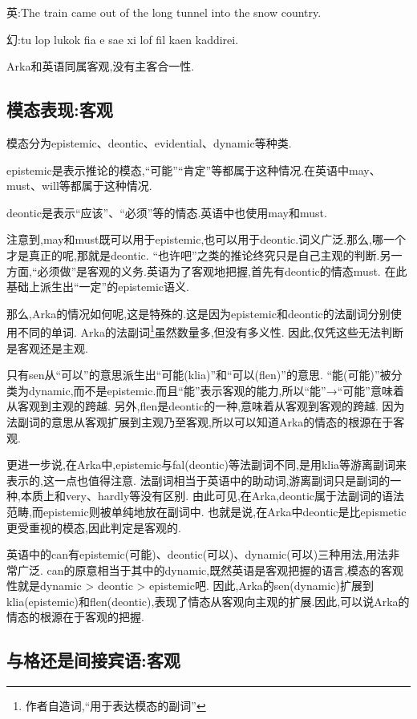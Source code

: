 {\kaishu

英:The train came out of the long tunnel into the snow country.

幻:tu lop lukok fia e sae xi lof fil kaen kaddirei.
}

Arka和英语同属客观,没有主客合一性.

\subsection{模态表现:客观}

模态分为epistemic、deontic、evidential、dynamic等种类.

epistemic是表示推论的模态,“可能”“肯定”等都属于这种情况.在英语中may、must、will等都属于这种情况.

deontic是表示“应该”、“必须”等的情态.英语中也使用may和must.

注意到,may和must既可以用于epistemic,也可以用于deontic.词义广泛.那么,哪一个才是真正的呢,那就是deontic.
“也许吧”之类的推论终究只是自己主观的判断.另一方面,“必须做”是客观的义务.英语为了客观地把握,首先有deontic的情态must.
在此基础上派生出“一定”的epistemic语义.

那么,Arka的情况如何呢,这是特殊的.这是因为epistemic和deontic的法副词分别使用不同的单词.
Arka的法副词\footnote{作者自造词,``用于表达模态的副词''}虽然数量多,但没有多义性.
因此,仅凭这些无法判断是客观还是主观.


只有sen从“可以”的意思派生出“可能(klia)”和“可以(flen)”的意思.
“能(可能)”被分类为dynamic,而不是epistemic.而且“能”表示客观的能力,所以“能”→“可能”意味着从客观到主观的跨越.
另外,flen是deontic的一种,意味着从客观到客观的跨越.
因为法副词的意思从客观扩展到主观乃至客观,所以可以知道Arka的情态的根源在于客观.

更进一步说,在Arka中,epistemic与fal(deontic)等法副词不同,是用klia等游离副词来表示的,这一点也值得注意.
法副词相当于英语中的助动词,游离副词只是副词的一种,本质上和very、hardly等没有区别.
由此可见,在Arka,deontic属于法副词的语法范畴,而epistemic则被单纯地放在副词中.
也就是说,在Arka中deontic是比epismetic更受重视的模态,因此判定是客观的.

英语中的can有epistemic(可能)、deontic(可以)、dynamic(可以)三种用法,用法非常广泛.
can的原意相当于其中的dynamic,既然英语是客观把握的语言,模态的客观性就是dynamic > deontic > epistemic吧.
因此,Arka的sen(dynamic)扩展到klia(epistemic)和flen(deontic),表现了情态从客观向主观的扩展.因此,可以说Arka的情态的根源在于客观的把握.

\subsection{与格还是间接宾语:客观}

